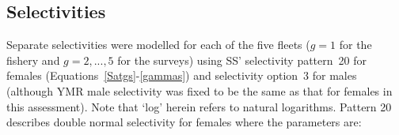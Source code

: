 \documentclass[11pt]{book}
\begin{document}
\subsection{Selectivities} \label{ss:select}

Separate selectivities were modelled for each of the five fleets ($g=1$ for the fishery and $g=2,...,5$ for the surveys) using SS' selectivity pattern~20 for females (Equations~\ref{Satgs}-\ref{gammas}) and selectivity option~3 for males (although YMR male selectivity was fixed to be the same as that for females in this assessment).
Note that `log' herein refers to natural logarithms. %
Pattern 20 describes double normal selectivity for females where the parameters are:
\end{document}
